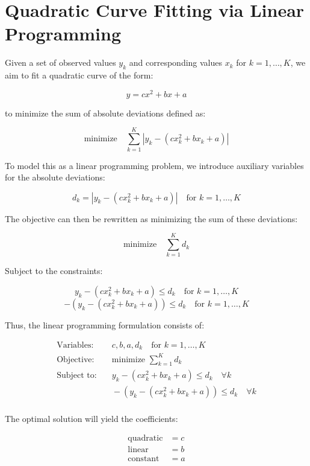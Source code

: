 \documentclass{article}
\begin{document}
\section*{Quadratic Curve Fitting via Linear Programming}

Given a set of observed values $y_k$ and corresponding values $x_k$ for $k = 1, \ldots, K$, we aim to fit a quadratic curve of the form:

\[
y = c x^2 + b x + a
\]

to minimize the sum of absolute deviations defined as:

\[
\text{minimize} \quad \sum_{k=1}^{K} |y_k - (c x_k^2 + b x_k + a)|
\]

To model this as a linear programming problem, we introduce auxiliary variables for the absolute deviations:

\[
d_k = |y_k - (c x_k^2 + b x_k + a)| \quad \text{for } k = 1, \ldots, K
\]

The objective can then be rewritten as minimizing the sum of these deviations:

\[
\text{minimize} \quad \sum_{k=1}^{K} d_k
\]

Subject to the constraints:

\[
y_k - (c x_k^2 + b x_k + a) \leq d_k \quad \text{for } k = 1, \ldots, K
\]
\[
-(y_k - (c x_k^2 + b x_k + a)) \leq d_k \quad \text{for } k = 1, \ldots, K
\]

Thus, the linear programming formulation consists of:

\begin{align*}
\text{Variables:} & \quad c, b, a, d_k \quad \text{for } k = 1, \ldots, K \\
\text{Objective:} & \quad \text{minimize } \sum_{k=1}^{K} d_k \\
\text{Subject to:} & \quad y_k - (c x_k^2 + b x_k + a) \leq d_k \quad \forall k \\
& \quad -(y_k - (c x_k^2 + b x_k + a)) \leq d_k \quad \forall k \\
\end{align*}

The optimal solution will yield the coefficients:

\begin{align*}
\text{quadratic} & = c \\
\text{linear} & = b \\
\text{constant} & = a \\
\end{align*}
\end{document}
